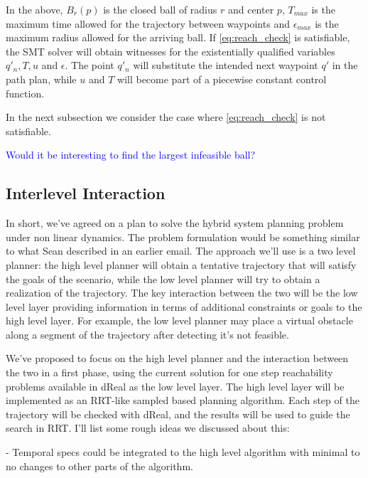 \documentclass[12pt]{article}
\newcommand\fran[1]{\textcolor{blue}{#1}}
\begin{document}
In the above, $B_r(p)$ is the closed ball of radius $r$ and center $p$, $T_{max}$ is the maximum time allowed for the trajectory between waypoints and $\epsilon_{max}$ is the maximum radius allowed for the arriving ball. If \ref{eq:reach_check} is satisfiable, the SMT solver will obtain witnesses for the existentially qualified variables $q'_n, T, u$ and $\epsilon$. The point $q'_n$ will substitute the intended next waypoint $q'$ in the path plan, while $u$ and $T$ will become part of a piecewise constant control function.

In the next subsection we consider the case where \ref{eq:reach_check} is not satisfiable.

\fran{Would it be interesting to find the largest infeasible ball?}

\subsection{Interlevel Interaction}
\label{sub:interlevel_interaction}






\iffalse
In short, we've agreed on a plan to solve the hybrid system planning problem under non linear dynamics. The problem formulation would be something similar to what Sean described in an earlier email. The approach we'll use is a two level planner: the high level planner will obtain a tentative trajectory that will satisfy the goals of the scenario, while the low level planner will try to obtain a realization of the trajectory. The key interaction between the two will be the low level layer providing information in terms of additional constraints or goals to the high level layer. For example, the low level planner may place a virtual obstacle along a segment of the trajectory after detecting it's not feasible.

We've proposed to focus on the high level planner and the interaction between the two in a first phase, using the current solution for one step reachability problems available in dReal as the low level layer. The high level layer will be implemented as an RRT-like sampled based planning algorithm. Each step of the trajectory will be checked with dReal, and the results will be used to guide the search in RRT. I'll list some rough ideas we discussed about this:

- Temporal specs could be integrated to the high level algorithm with minimal to no changes to other parts of the algorithm.
\end{document}

